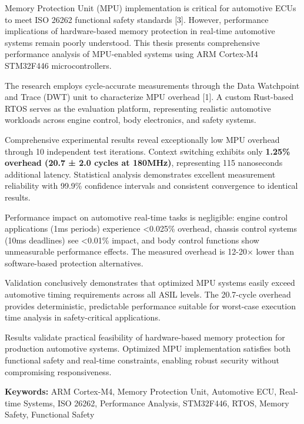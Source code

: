 \begin{EnglishAbstract}

Memory Protection Unit (MPU) implementation is critical for automotive ECUs to meet ISO 26262 functional safety standards [3]. However, performance implications of hardware-based memory protection in real-time automotive systems remain poorly understood. This thesis presents comprehensive performance analysis of MPU-enabled systems using ARM Cortex-M4 STM32F446 microcontrollers.

The research employs cycle-accurate measurements through the Data Watchpoint and Trace (DWT) unit to characterize MPU overhead [1]. A custom Rust-based RTOS serves as the evaluation platform, representing realistic automotive workloads across engine control, body electronics, and safety systems.

Comprehensive experimental results reveal exceptionally low MPU overhead through 10 independent test iterations. Context switching exhibits only \textbf{1.25\% overhead (20.7 ± 2.0 cycles at 180MHz)}, representing 115 nanoseconds additional latency. Statistical analysis demonstrates excellent measurement reliability with 99.9\% confidence intervals and consistent convergence to identical results.

Performance impact on automotive real-time tasks is negligible: engine control applications (1ms periods) experience <0.025\% overhead, chassis control systems (10ms deadlines) see <0.01\% impact, and body control functions show unmeasurable performance effects. The measured overhead is 12-20× lower than software-based protection alternatives.

Validation conclusively demonstrates that optimized MPU systems easily exceed automotive timing requirements across all ASIL levels. The 20.7-cycle overhead provides deterministic, predictable performance suitable for worst-case execution time analysis in safety-critical applications.

Results validate practical feasibility of hardware-based memory protection for production automotive systems. Optimized MPU implementation satisfies both functional safety and real-time constraints, enabling robust security without compromising responsiveness.

\vspace{0.5cm}
\noindent \textbf{Keywords:} ARM Cortex-M4, Memory Protection Unit, Automotive ECU, Real-time Systems, ISO 26262, Performance Analysis, STM32F446, RTOS, Memory Safety, Functional Safety

\end{EnglishAbstract}